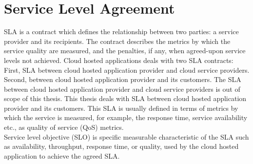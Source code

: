 \section{Service Level Agreement}
\label{sec:SLA}
SLA is a contract which defines the relationship between two parties: a service provider and its recipients. The contract describes the metrics by which the service quality are measured, and the penalties, if any, when agreed-upon service levels not achieved. Cloud hosted applications deals with two SLA contracts: First, SLA between cloud hosted application provider and cloud service providers. Second, between cloud hosted application provider and its customers. The SLA between cloud hosted application provider and cloud service providers is out of scope of this thesis. This thesis deals with SLA between cloud hosted application provider and its customers. This SLA is usually defined in terms of metrics by which the service is measured, for example, the response time, service availability etc., as quality of service (QoS) metrics.
\\
Service level objective (SLO) is specific measurable characteristic of the SLA such as availability, throughput, response time, or quality, used by the cloud hosted application to achieve the agreed SLA.
